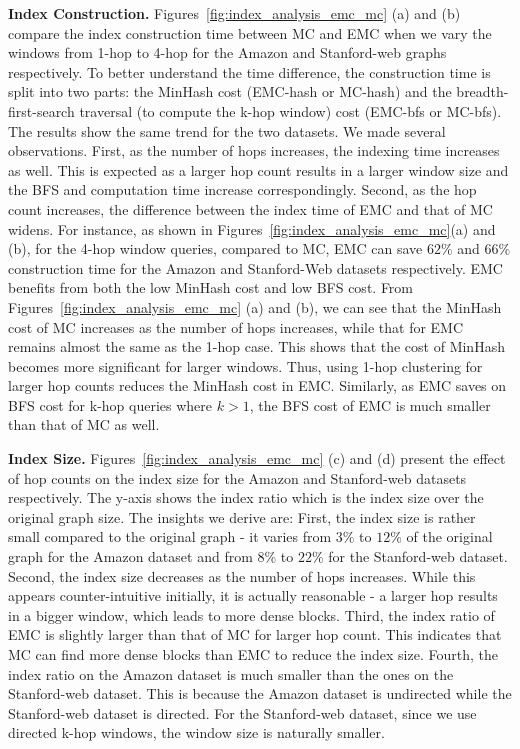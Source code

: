\textbf{Index Construction. } Figures~\ref{fig:index_analysis_emc_mc} 
(a) and (b) compare the index construction time between MC and EMC 
when we vary the windows from 1-hop to 4-hop for the Amazon and Stanford-web 
graphs respectively. To better understand the time difference, 
the construction time is split into two parts: 
the MinHash cost (EMC-hash or MC-hash) and the breadth-first-search traversal (to compute the k-hop window)  cost (EMC-bfs or MC-bfs). The results show the same trend 
for the two datasets. We made several observations.
First, as the number of hops increases, the indexing time increases as well. 
This is expected as a larger hop count results in a larger window size 
and the BFS and computation time increase correspondingly. 
Second, as the hop count increases, the difference between the
index time of EMC and that of MC widens. 
For instance, as shown in Figures~\ref{fig:index_analysis_emc_mc}(a) and (b), for the 4-hop window queries, compared to MC, 
EMC can save $62\%$ and $66\%$ construction time for the Amazon and Stanford-Web datasets respectively.
EMC benefits from both the low MinHash cost and low BFS cost. 
From Figures~\ref{fig:index_analysis_emc_mc} (a) and (b), 
we can see that the MinHash cost of MC increases as the number of hops 
increases, while that for EMC remains almost the same as the 1-hop case. 
This shows that the cost of MinHash becomes more significant for larger windows. 
Thus, using 1-hop clustering for larger hop counts reduces the MinHash cost 
in EMC. Similarly, as EMC saves on BFS cost for k-hop queries where $k > 1$, 
the BFS cost of EMC is much smaller than that of MC as well. 

\textbf{Index Size.} Figures~\ref{fig:index_analysis_emc_mc} (c) and (d) 
present the effect of hop counts on the index size for the Amazon and Stanford-web 
datasets respectively. The y-axis shows the index ratio which is the index size over the original graph size. The insights we derive are: 
First, the index size is rather small compared to the original graph - it
varies from $3\%$ to $12\%$ of the original graph for the Amazon dataset 
and from $8\%$ to $22\%$ for the Stanford-web dataset. 
Second, the index size decreases as the number of hops increases. 
While this appears counter-intuitive initially, it is actually reasonable - a larger hop results in a bigger window, which leads
to more dense blocks. Third, the index ratio of EMC is slightly larger 
than that of MC for larger hop count. This indicates that MC can find more dense blocks 
than EMC to reduce the index size. Fourth, the index ratio on 
the Amazon dataset is much smaller than the ones on the Stanford-web dataset. 
This is because the Amazon dataset is undirected while the Stanford-web dataset
is directed. For the Stanford-web dataset, since we use directed k-hop windows, the window size is naturally smaller. 

